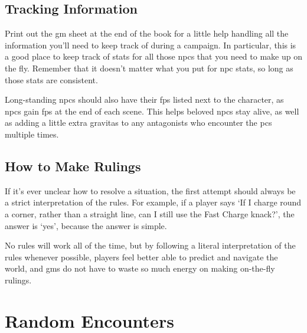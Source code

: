 \begin{multicols}{2}
\subsection{Tracking Information}

Print out the \gls{gm} sheet at the end of the book for a little help handling all the information you'll need to keep track of during a campaign.
In particular, this is a good place to keep track of stats for all those \glspl{npc} that you need to make up on the fly.
Remember that it doesn't matter what you put for \gls{npc} stats, so long as those stats are consistent.

Long-standing \glspl{npc} should also have their \glspl{fp} listed next to the character, as \glspl{npc} gain \glspl{fp} at the end of each scene.
This helps beloved \glspl{npc} stay alive, as well as adding a little extra gravitas to any antagonists who encounter the \glspl{pc} multiple times.

\subsection{How to Make Rulings}

If it's ever unclear how to resolve a situation, the first attempt should always be a strict interpretation of the rules.
For example, if a player says `If I charge round a corner, rather than a straight line, can I still use the Fast Charge knack?', the answer is `yes', because the answer is simple.

No rules will work all of the time, but by following a literal interpretation of the rules whenever possible, players feel better able to predict and navigate the world, and \glspl{gm} do not have to waste so much energy on making on-the-fly rulings.

\end{multicols}

\section{Random Encounters}
\label{encounters}

